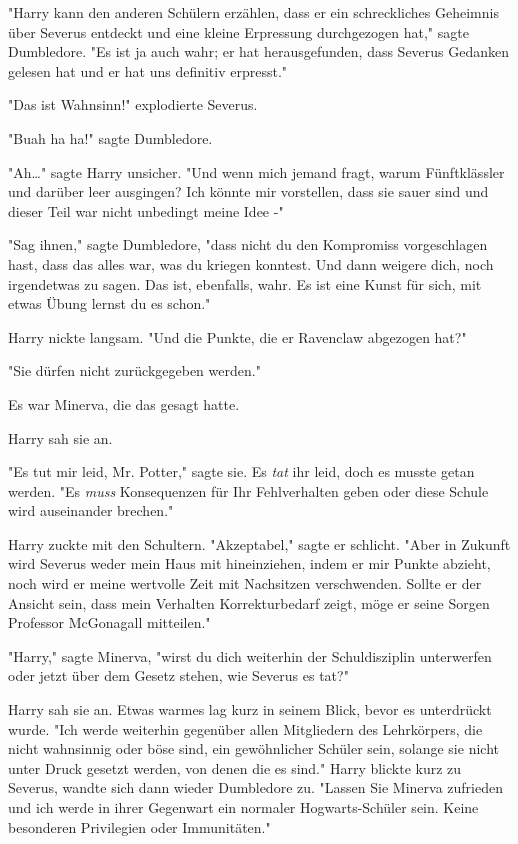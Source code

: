 {"Harry kann den anderen Schülern erzählen, dass er ein schreckliches Geheimnis über Severus entdeckt und eine kleine Erpressung durchgezogen hat," sagte Dumbledore. "Es ist ja auch wahr; er hat herausgefunden, dass Severus Gedanken gelesen hat und er hat uns definitiv erpresst."

"Das ist Wahnsinn!" explodierte Severus.

"Buah ha ha!" sagte Dumbledore.

"Ah…" sagte Harry unsicher. "Und wenn mich jemand fragt, warum Fünftklässler und darüber leer ausgingen? Ich könnte mir vorstellen, dass sie sauer sind und dieser Teil war nicht unbedingt meine Idee -"

"Sag ihnen," sagte Dumbledore, "dass nicht du den Kompromiss vorgeschlagen hast, dass das alles war, was du kriegen konntest. Und dann weigere dich, noch irgendetwas zu sagen. Das ist, ebenfalls, wahr. Es ist eine Kunst für sich, mit etwas Übung lernst du es schon."

Harry nickte langsam. "Und die Punkte, die er Ravenclaw abgezogen hat?"

"Sie dürfen nicht zurückgegeben werden."

Es war Minerva, die das gesagt hatte.

Harry sah sie an.

"Es tut mir leid, Mr. Potter," sagte sie. Es \emph{tat} ihr leid, doch es musste getan werden. "Es \emph{muss} Konsequenzen für Ihr Fehlverhalten geben oder diese Schule wird auseinander brechen."

Harry zuckte mit den Schultern. "Akzeptabel," sagte er schlicht. "Aber in Zukunft wird Severus weder mein Haus mit hineinziehen, indem er mir Punkte abzieht, noch wird er meine wertvolle Zeit mit Nachsitzen verschwenden. Sollte er der Ansicht sein, dass mein Verhalten Korrekturbedarf zeigt, möge er seine Sorgen Professor McGonagall mitteilen."

"Harry," sagte Minerva, "wirst du dich weiterhin der Schuldisziplin unterwerfen oder jetzt über dem Gesetz stehen, wie Severus es tat?"

Harry sah sie an. Etwas warmes lag kurz in seinem Blick, bevor es unterdrückt wurde. "Ich werde weiterhin gegenüber allen Mitgliedern des Lehrkörpers, die nicht wahnsinnig oder böse sind, ein gewöhnlicher Schüler sein, solange sie nicht unter Druck gesetzt werden, von denen die es sind." Harry blickte kurz zu Severus, wandte sich dann wieder Dumbledore zu. "Lassen Sie Minerva zufrieden und ich werde in ihrer Gegenwart ein normaler Hogwarts-Schüler sein. Keine besonderen Privilegien oder Immunitäten."

}
